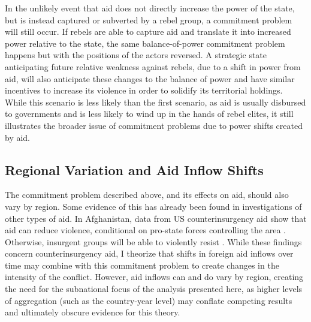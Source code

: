 \documentclass[12pt, letterpaper]{article}
\renewcommand{\cite}{\citep}
\begin{document}
In the unlikely event that aid does not directly increase the power of the state, but is instead captured or subverted by a rebel group, a commitment problem will still occur. If rebels are able to capture aid and translate it into increased power relative to the state, the same balance-of-power commitment problem happens but with the positions of the actors reversed. A strategic state anticipating future relative weakness against rebels, due to a shift in power from aid, will also anticipate these changes to the balance of power and have similar incentives to increase its violence in order to solidify its territorial holdings. While this scenario is less likely than the first scenario, as aid is usually disbursed to governments and is less likely to wind up in the hands of rebel elites, it still illustrates the broader issue of commitment problems due to power shifts created by aid.

	
\subsection{Regional Variation and Aid Inflow Shifts}

The commitment problem described above, and its effects on aid, should also vary by region. Some evidence of this has already been found in investigations of other types of aid. In Afghanistan, data from US counterinsurgency aid show that aid can reduce violence, conditional on pro-state forces controlling the area \cite{sexton2016aid}. Otherwise, insurgent groups will be able to violently resist \cite{sexton2016aid}. While these findings concern counterinsurgency aid, I theorize that shifts in foreign aid inflows over time may combine with this commitment problem to create changes in the intensity of the conflict. However, aid inflows can and do vary by region, creating the need for the subnational focus of the analysis presented here, as higher levels of aggregation (such as the country-year level) may conflate competing results and ultimately obscure evidence for this theory. 
\end{document}
